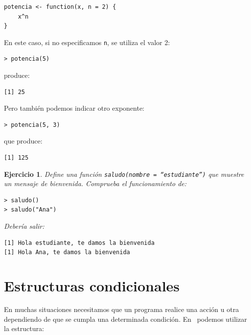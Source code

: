 \documentclass[11pt,a4paper]{article}
\newcommand{\R}{\textcolor{azuluc}{\faIcon{r-project}}}
\theoremstyle{exercise}
\newtheorem{exercise}{Ejercicio}
\begin{document}
\begin{lstlisting}[style=rstyle]
potencia <- function(x, n = 2) {
	x^n
}
\end{lstlisting}

\noindent En este caso, si no especificamos \texttt{n}, se utiliza el valor 2:

\begin{lstlisting}[style=rconsole]
> potencia(5)
\end{lstlisting}

\noindent produce:

\begin{lstlisting}[style=routput]
[1] 25
\end{lstlisting}

\noindent Pero también podemos indicar otro exponente:

\begin{lstlisting}[style=rconsole]
> potencia(5, 3)
\end{lstlisting}

\noindent que produce:

\begin{lstlisting}[style=routput]
[1] 125
\end{lstlisting}

\begin{exercise}
Define una función \texttt{saludo(nombre = ``estudiante'')} que muestre un mensaje de bienvenida. Comprueba el funcionamiento de:

\begin{lstlisting}[style=rconsole]
> saludo()
> saludo("Ana")
\end{lstlisting}

\noindent Debería salir:
\begin{lstlisting}[style=routput]
[1] Hola estudiante, te damos la bienvenida
[1] Hola Ana, te damos la bienvenida
\end{lstlisting}


\end{exercise}

\section{Estructuras condicionales}

En muchas situaciones necesitamos que un programa realice una acción u otra dependiendo de que se cumpla una determinada condición. En \R\ podemos utilizar la estructura:
\end{document}
